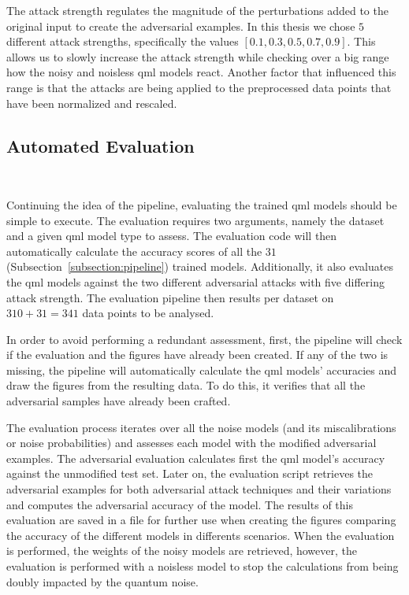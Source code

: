 The attack strength regulates the magnitude of the perturbations
added to the original input to create the adversarial examples. 
In this thesis we chose \(5\) different attack strengths,
specifically the values \(\left[0.1, 0.3, 0.5, 0.7, 0.9\right]\).
This allows us to slowly increase the attack strength while
checking over a big range how the noisy and noisless \ac{qml}
models react. Another factor that influenced this range is that
the attacks are being applied to the preprocessed data points
that have been normalized and rescaled. \

\subsection{Automated Evaluation}\label{subsection:evaluation} \

Continuing the idea of the pipeline, evaluating the trained
\ac{qml} models should be simple to execute. The evaluation
requires two arguments, namely the dataset and a given \ac{qml}
model type to assess. The evaluation code will then
automatically calculate the accuracy scores of all the \(31\)
(Subsection~\ref{subsection:pipeline}) trained models. Additionally,
it also evaluates the \ac{qml} models against the two different
adversarial attacks with five differing attack strength.
The evaluation pipeline then results per dataset on \(310 + 31 = 341\)
data points to be analysed. \

In order to avoid performing a redundant assessment, first,
the pipeline will check if the evaluation and the figures
have already been created. If any of the two is missing,
the pipeline will automatically calculate the \ac{qml} models'
accuracies and draw the figures from the resulting data. To
do this, it verifies that all the adversarial samples have
already been crafted. \

The evaluation process iterates over all the noise
models (and its miscalibrations or noise probabilities)
and assesses each model with the modified adversarial
examples. The adversarial evaluation calculates first the
\ac{qml} model's accuracy against the unmodified test set.
Later on, the evaluation script retrieves the adversarial
examples for both adversarial attack techniques and their
variations and computes the adversarial accuracy of the model.
The results of this evaluation are saved in a file
for further use when creating the figures comparing the
accuracy of the different models in differents scenarios.
When the evaluation is performed, the weights of the noisy
models are retrieved, however, the evaluation is performed
with a noisless model to stop the calculations from being
doubly impacted by the quantum noise. \

